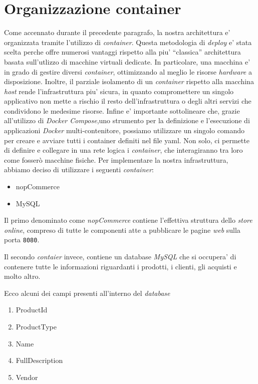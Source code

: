 \documentclass[a4paper]{report}
\newcommand{\quotes}[1]{``#1''}
\begin{document}
	\section{Organizzazione container}\label{organizzazione_container}
		Come accennato durante il precedente paragrafo, la nostra architettura e' organizzata tramite l'utilizzo di
		\emph{container}. Questa metodologia di  \emph{deploy} e' stata scelta perche offre numerosi vantaggi rispetto
		alla piu' \quotes{classica} architettura basata sull'utlizzo di macchine virtuali dedicate. In particolare, una
		macchina e' in grado di gestire diversi \emph{container}, ottimizzando al meglio le risorse
		\emph{hardware} a disposizione. Inoltre, il parziale isolamento di un \emph{container} rispetto alla macchina
		\emph{host} rende l'infrastruttura piu' sicura, in quanto compromettere un singolo applicativo non mette a
		rischio il resto dell'infrastruttura o degli altri servizi che condividono le medesime risorse.
		Infine e' importante sottolineare che, grazie all'utilizzo di \emph{Docker Compose},uno strumento per la 
		definizione e l'esecuzione di applicazioni \emph{Docker} multi-contenitore, possiamo utilizzare un singolo comando per
		creare e avviare tutti i container definiti nel file yaml. Non solo, ci permette di definire e collegare in una
		rete logica i \emph{container}, che interagiranno tra loro come fosserò macchine fisiche.
		Per implementare la nostra infrastruttura, abbiamo deciso di utilizzare i seguenti \emph{container}:
		\begin{itemize}
			\item nopCommerce
			\item MySQL
		\end{itemize}
		Il primo denominato come \emph{nopCommerce} contiene l'effettiva struttura dello \emph{store online}, compreso
		di tutte le componenti atte a pubblicare le pagine \emph{web} sulla porta \texttt{8080}.
		
		Il secondo \emph{contaier} invece, contiene un database \emph{MySQL} che si occupera' di contenere tutte le
		informazioni riguardanti i prodotti, i clienti, gli acquisti e molto altro.
		
		Ecco alcuni dei campi presenti all'interno del \emph{database}
		\begin{enumerate}
			\item ProductId
			\item ProductType
			\item Name
			\item FullDescription
			\item Vendor
		\end{enumerate}
\end{document}
